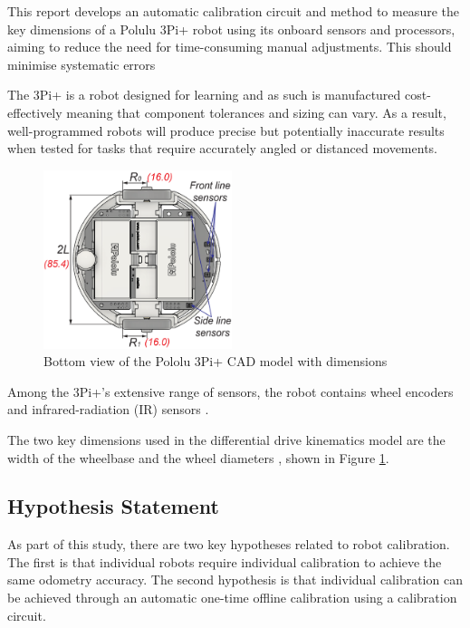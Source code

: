\documentclass[conference]{IEEEtran}
\begin{document}
This report develops an automatic calibration circuit and method to measure the key dimensions of a Polulu 3Pi+ robot using its onboard sensors and processors, aiming to reduce the need for time-consuming manual adjustments. This should minimise systematic errors \cite{odometry} 

The 3Pi+ is a robot designed for learning and as such is manufactured cost-effectively meaning that component tolerances and sizing can vary. As a result, well-programmed robots will produce precise but potentially inaccurate results when tested for tasks that require accurately angled or distanced movements. 

\begin{figure}[h!]
    \centering
    \includegraphics[width = 0.49\textwidth]{img/robot_schemtatic.png}
    \caption{Bottom view of the Pololu 3Pi+ CAD model with dimensions \cite{pololu_guide}}
    \label{fig:dimensions}
\end{figure}

Among the 3Pi+'s extensive range of sensors, the robot contains wheel encoders and infrared-radiation (IR) sensors \cite{pololu_guide}. 

The two key dimensions used in the differential drive kinematics model are the width of the wheelbase and the wheel diameters \cite{pololu_guide}, shown in Figure \ref{fig:dimensions}.


\subsection{Hypothesis Statement}

As part of this study, there are two key hypotheses related to robot calibration. The first is that individual robots require individual calibration to achieve the same odometry accuracy. The second hypothesis is that individual calibration can be achieved through an automatic one-time offline calibration using a calibration circuit.
\end{document}

